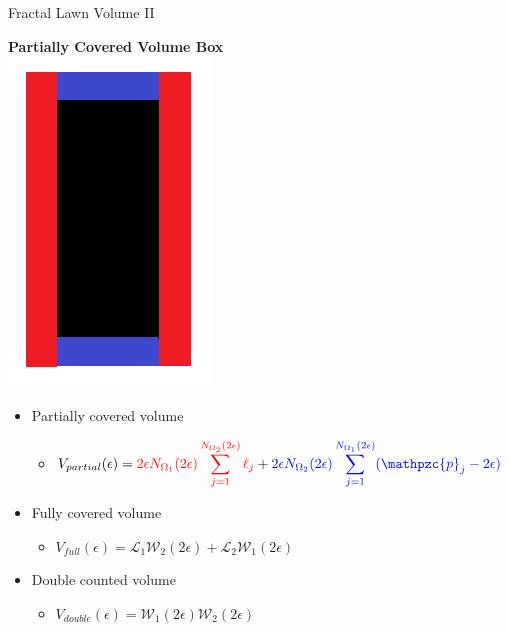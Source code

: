 \documentclass{if-beamer}
\newcommand{\SL}{\mathcal{L}}
\newcommand{\Om}{\Omega}
\newcommand{\W}{\mathcal{W}}
\newcommand{\p}{\mathpzc{p}}
\begin{document}
\begin{frame}{Fractal Lawn Volume II}
	\begin{center}
		{\bf Partially Covered Volume Box} \\
		\includegraphics[scale=0.25]{VolumeBox.png}
	\end{center}
	\pause
	\vspace{0.2in}
	
	\begin{itemize}
		\item Partially covered volume
		\begin{itemize}
			\item $\displaystyle V_{partial}(\epsilon)=\textcolor{red}{2\epsilon N_{\Om_1}(2\epsilon)\sum_{j=1}^{N_{\Om_2}(2\epsilon)} \ell_j} + \textcolor{blue}{2\epsilon N_{\Om_2}(2\epsilon)\sum_{j=1}^{N_{\Om_1}(2\epsilon)} (\p_j - 2\epsilon)}$
		\end{itemize}
		\pause
		
		\item Fully covered volume
		\begin{itemize}
			\item $\displaystyle V_{full}(\epsilon)=\SL_1 \W_2(2\epsilon) + \SL_2 \W_1(2\epsilon)$
		\end{itemize}
		\pause
		
		\item Double counted volume
		\begin{itemize}
			\item $V_{double}(\epsilon)=\W_1(2\epsilon) \W_2(2\epsilon)$
		\end{itemize}
	\end{itemize}
	
\end{frame}
\end{document}
